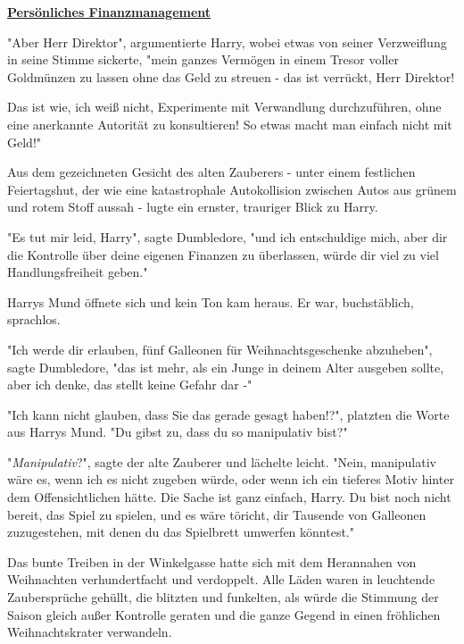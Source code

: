 

\hypertarget{persuxf6nliches-finanzmanagement}{%

\textbf{\uline{Persönliches Finanzmanagement}}

"Aber Herr Direktor", argumentierte Harry, wobei etwas von seiner Verzweiflung in seine Stimme sickerte, "mein ganzes Vermögen in einem Tresor voller Goldmünzen zu lassen ohne das Geld zu streuen - das ist verrückt, Herr Direktor!

Das ist wie, ich weiß nicht, Experimente mit Verwandlung durchzuführen, ohne eine anerkannte Autorität zu konsultieren! So etwas macht man einfach nicht mit Geld!"

Aus dem gezeichneten Gesicht des alten Zauberers - unter einem festlichen Feiertagshut, der wie eine katastrophale Autokollision zwischen Autos aus grünem und rotem Stoff aussah - lugte ein ernster, trauriger Blick zu Harry.

"Es tut mir leid, Harry", sagte Dumbledore, "und ich entschuldige mich, aber dir die Kontrolle über deine eigenen Finanzen zu überlassen, würde dir viel zu viel Handlungsfreiheit geben."

Harrys Mund öffnete sich und kein Ton kam heraus. Er war, buchstäblich, sprachlos.

"Ich werde dir erlauben, fünf Galleonen für Weihnachtsgeschenke abzuheben", sagte Dumbledore, "das ist mehr, als ein Junge in deinem Alter ausgeben sollte, aber ich denke, das stellt keine Gefahr dar -"

"Ich kann nicht glauben, dass Sie das gerade gesagt haben!?", platzten die Worte aus Harrys Mund. "Du gibst zu, dass du so manipulativ bist?"

"\emph{Manipulativ}?", sagte der alte Zauberer und lächelte leicht. "Nein, manipulativ wäre es, wenn ich es nicht zugeben würde, oder wenn ich ein tieferes Motiv hinter dem Offensichtlichen hätte. Die Sache ist ganz einfach, Harry. Du bist noch nicht bereit, das Spiel zu spielen, und es wäre töricht, dir Tausende von Galleonen zuzugestehen, mit denen du das Spielbrett umwerfen könntest."

Das bunte Treiben in der Winkelgasse hatte sich mit dem Herannahen von Weihnachten verhundertfacht und verdoppelt. Alle Läden waren in leuchtende Zaubersprüche gehüllt, die blitzten und funkelten, als würde die Stimmung der Saison gleich außer Kontrolle geraten und die ganze Gegend in einen fröhlichen Weihnachtskrater verwandeln.

}
